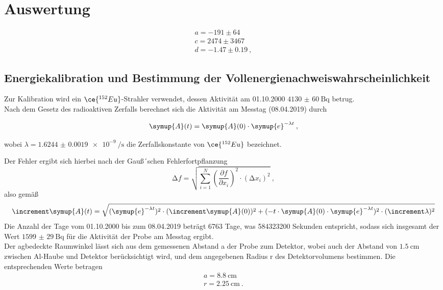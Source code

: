 \section{Auswertung}
\label{sec:Auswertung}
\begin{align*}
  a = -191 \pm 64 \\
  c = 2474 \pm 3467 \\
  d = -1.47 \pm 0.19\:,
\end{align*}
\subsection{Energiekalibration und Bestimmung der Vollenergienachweiswahrscheinlichkeit}
Zur Kalibration wird ein $\ce{^{152}Eu}$-Strahler verwendet, dessen Aktivität am 01.10.2000
$\SI{4130(60)}{\becquerel} $ betrug. \\
Nach dem Gesetz des radioaktiven Zerfalls berechnet sich die Aktivität am Messtag (08.04.2019) durch

\begin{equation}
  \symup{A} (t) = \symup{A}(0)\cdot \symup{e}^{-\lambda t} \: ,
\end{equation}

wobei $\lambda=\SI{1.6244(19)e-9}{\per\second}$ \cite{lara} die Zerfallskonstante
von $\ce{^{152}Eu}$ bezeichnet.

Der Fehler ergibt sich hierbei nach der Gauß´schen Fehlerfortpflanzung
\begin{equation}
  \increment f = \sqrt{ \sum_{i=1}^N \left( \frac{\partial f}{\partial x_i}\right)^2
  \cdot (\increment x_i)^2  } \: ,
  \label{eqn:gaus}
\end{equation}
also gemäß
\begin{equation}
  \increment \symup{A} (t) = \sqrt{ (\symup{e}^{-\lambda t})^{2}\cdot (\increment \symup{A}(0))^2
   + (-t\cdot\symup{A}(0)\cdot \symup{e}^{-\lambda t})^2\cdot(\increment \lambda)^2}
\end{equation}
Die Anzahl der Tage vom 01.10.2000 bis zum 08.04.2019 beträgt 6763 Tage, was
584323200 Sekunden entspricht, sodass sich insgesamt der Wert $\SI{1599(29)}{\becquerel} $
für die Aktivität der Probe am Messtag ergibt. \\
Der agbedeckte Raumwinkel lässt sich aus dem gemessenen Abstand a der Probe
zum Detektor, wobei auch der Abstand von $\SI{1.5}{\centi\meter}$ zwischen Al-Haube und Detektor
berücksichtigt wird,
und dem angegebenen Radius r des Detektorvolumens bestimmen. Die entsprechenden Werte
betragen
\begin{align*}
  a = \SI{8.8}{\centi\meter} \\
  r = \SI{2.25}{\centi\meter} \: .
\end{align*}

